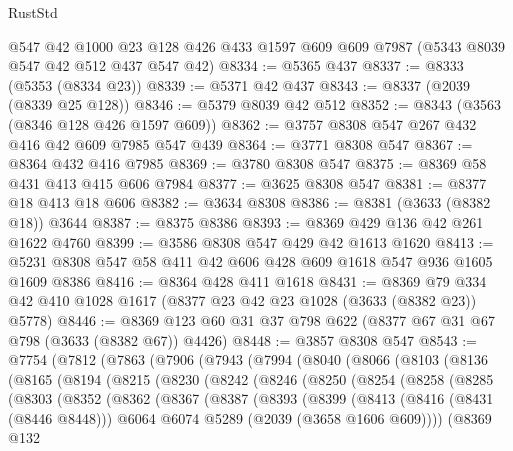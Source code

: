 \begin{lexlean}{RustStd}
\begin{coremodule}
    @547
    @42
    @1000
    @23
    @128
    @426
    @433
    @1597
    @609
    @609
    @7987
    (@5343 @8039 @547 @42 @512 @437 @547 @42)
@8334 := @5365 @437
@8337 := @8333 (@5353 (@8334 @23))
@8339 := @5371 @42 @437
@8343 := @8337 (@2039 (@8339 @25 @128))
@8346 := @5379 @8039 @42 @512
@8352 := @8343 (@3563 (@8346 @128 @426 @1597 @609))
@8362 := @3757 @8308 @547 @267 @432 @416 @42 @609 @7985 @547 @439
@8364 := @3771 @8308 @547
@8367 := @8364 @432 @416 @7985
@8369 := @3780 @8308 @547
@8375 := @8369 @58 @431 @413 @415 @606 @7984
@8377 := @3625 @8308 @547
@8381 := @8377 @18 @413 @18 @606
@8382 := @3634 @8308
@8386 := @8381 (@3633 (@8382 @18)) @3644
@8387 := @8375 @8386
@8393 := @8369 @429 @136 @42 @261 @1622 @4760
@8399 := @3586 @8308 @547 @429 @42 @1613 @1620
@8413 := @5231 @8308 @547 @58 @411 @42 @606 @428 @609 @1618 @547 @936 @1605 @1609 @8386
@8416 := @8364 @428 @411 @1618
@8431 := @8369 @79 @334 @42 @410 @1028 @1617 (@8377 @23 @42 @23 @1028 (@3633 (@8382 @23)) @5778)
@8446 := @8369 @123 @60 @31 @37 @798 @622 (@8377 @67 @31 @67 @798 (@3633 (@8382 @67)) @4426)
@8448 := @3857 @8308 @547
@8543 := @7754
    (@7812
      (@7863
        (@7906
          (@7943
            (@7994
              (@8040
                (@8066
                  (@8103
                    (@8136
                      (@8165
                        (@8194
                          (@8215
                            (@8230
                              (@8242
                                (@8246
                                  (@8250
                                    (@8254
                                      (@8258
                                        (@8285
                                          (@8303
                                            (@8352
                                              (@8362
                                                (@8367
                                                  (@8387
                                                    (@8393
                                                      (@8399
                                                        (@8413
                                                          (@8416 (@8431 (@8446 @8448)))
                                                          @6064
                                                          @6074
                                                          @5289
                                                          (@2039 (@3658 @1606 @609))))
                                                      (@8369
                                                        @132

\end{coremodule}
\end{lexlean}
